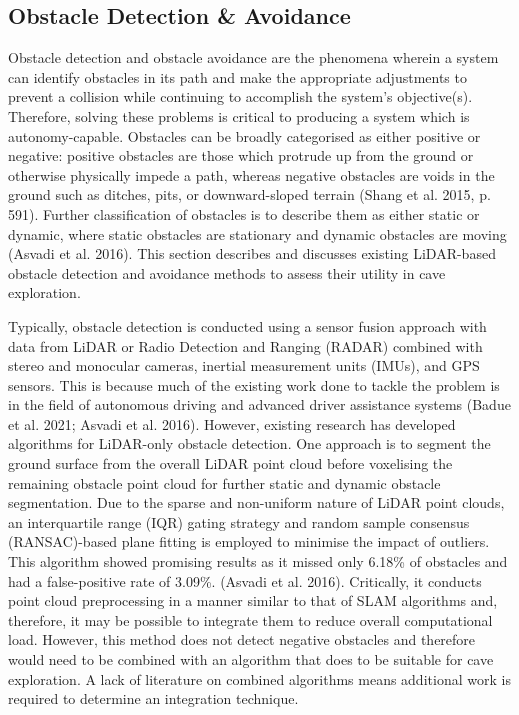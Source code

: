 \subsection{Obstacle Detection \& Avoidance}

Obstacle detection and obstacle avoidance are the phenomena wherein a system can identify obstacles in its path and make the appropriate adjustments to prevent a collision while continuing to accomplish the system's objective(s). Therefore, solving these problems is critical to producing a system which is autonomy-capable. Obstacles can be broadly categorised as either positive or negative: positive obstacles are those which protrude up from the ground or otherwise physically impede a path, whereas negative obstacles are voids in the ground such as ditches, pits, or downward-sloped terrain (Shang et al. 2015, p. 591). Further classification of obstacles is to describe them as either static or dynamic, where static obstacles are stationary and dynamic obstacles are moving (Asvadi et al. 2016). This section describes and discusses existing LiDAR-based obstacle detection and avoidance methods to assess their utility in cave exploration.

Typically, obstacle detection is conducted using a sensor fusion approach with data from LiDAR or Radio Detection and Ranging (RADAR) combined with stereo and monocular cameras, inertial measurement units (IMUs), and GPS sensors. This is because much of the existing work done to tackle the problem is in the field of autonomous driving and advanced driver assistance systems (Badue et al. 2021; Asvadi et al. 2016). However, existing research has developed algorithms for LiDAR-only obstacle detection. One approach is to segment the ground surface from the overall LiDAR point cloud before voxelising the remaining obstacle point cloud for further static and dynamic obstacle segmentation. Due to the sparse and non-uniform nature of LiDAR point clouds, an interquartile range (IQR) gating strategy and random sample consensus (RANSAC)-based plane fitting is employed to minimise the impact of outliers. This algorithm showed promising results as it missed only 6.18\% of obstacles and had a false-positive rate of 3.09\%.  (Asvadi et al. 2016). Critically, it conducts point cloud preprocessing in a manner similar to that of SLAM algorithms and, therefore, it may be possible to integrate them to reduce overall computational load. However, this method does not detect negative obstacles and therefore would need to be combined with an algorithm that does to be suitable for cave exploration. A lack of literature on combined algorithms means additional work is required to determine an integration technique.

